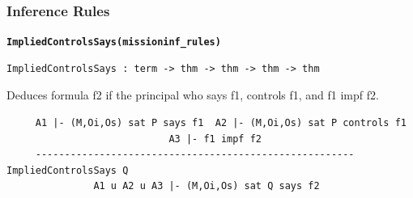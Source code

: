\documentclass[10pt,twoside]{article}
\begin{document}
\HOLmissionRolesTheorems









\subsubsection{Inference Rules}
\label{sec:inference-rules-1}

\begin{holboxed}
  \begin{Large}
    \texttt{\textbf{ImpliedControlsSays}}\hfill{}\texttt{\textbf{(missioninf\_rules)}}
  \end{Large}
\end{holboxed}

\begin{verbatim}
ImpliedControlsSays : term -> thm -> thm -> thm -> thm
\end{verbatim}

\SYNOPSIS Deduces formula f2 if the principal who says f1, controls
f1, and f1 impf f2.

\DESCRIBE

\begin{scriptsize}
\begin{verbatim}
     A1 |- (M,Oi,Os) sat P says f1  A2 |- (M,Oi,Os) sat P controls f1
                            A3 |- f1 impf f2
     ------------------------------------------------------- ImpliedControlsSays Q
               A1 u A2 u A3 |- (M,Oi,Os) sat Q says f2
\end{verbatim}
\end{scriptsize}
\end{document}

